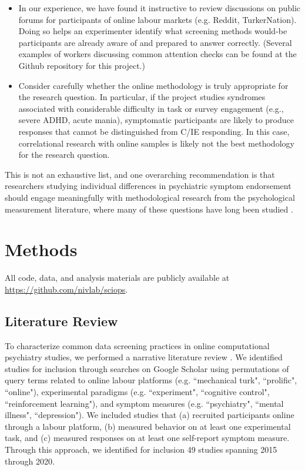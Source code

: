 \documentclass[a4paper,notitlepage,12pt]{article}
\begin{document}
\begin{refsection}[main]
\begin{itemize}
    \item In our experience, we have found it instructive to review discussions on public forums for participants of online labour markets (e.g. Reddit, TurkerNation). Doing so helps an experimenter identify what screening methods would-be participants are already aware of and prepared to answer correctly. (Several examples of workers discussing common attention checks can be found at the Github repository for this project.)
    
    \item Consider carefully whether the online methodology is truly appropriate for the research question. In particular, if the project studies syndromes associated with considerable difficulty in task or survey engagement (e.g., severe ADHD, acute mania), symptomatic participants are likely to produce responses that cannot be distinguished from C/IE responding. In this case, correlational research with online samples is likely not the best methodology for the research question.

\end{itemize}

This is not an exhaustive list, and one overarching recommendation is that researchers studying individual differences in psychiatric symptom endorsement should engage meaningfully with methodological research from the psychological measurement literature, where many of these questions have long been studied \cite{huang2015insufficient, curran2016methods, thomas2017validity, desimone2018dirty, ophir2020turker}.

\newpage

\section{Methods}

All code, data, and analysis materials are publicly available at \url{https://github.com/nivlab/sciops}. 

\subsection{Literature Review}

To characterize common data screening practices in online computational psychiatry studies, we performed a narrative literature review \cite{grant2009typology}. We identified studies for inclusion through searches on Google Scholar using permutations of query terms related to online labour platforms (e.g. ``mechanical turk", ``prolific", ``online"), experimental paradigms (e.g. ``experiment", ``cognitive control", ``reinforcement learning"), and symptom measures (e.g. ``psychiatry", ``mental illness", ``depression"). We included studies that (a) recruited participants online through a labour platform, (b) measured behavior on at least one experimental task, and (c) measured responses on at least one self-report symptom measure. Through this approach, we identified for inclusion 49 studies spanning 2015 through 2020.


\end{refsection}
\end{document}
